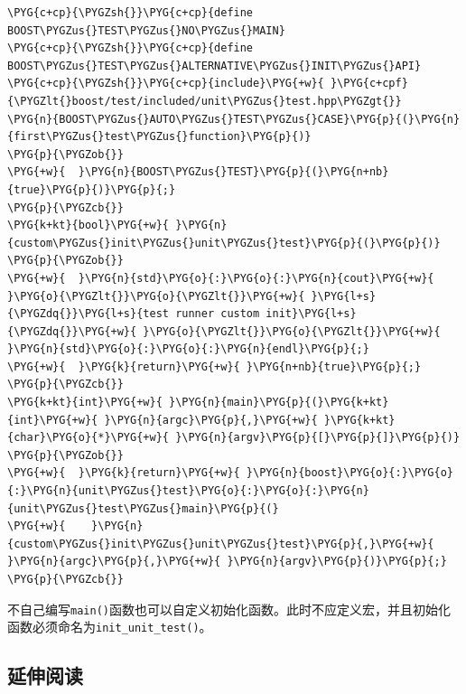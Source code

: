 \begin{codeblockbg}
\begin{Verbatim}[commandchars=\\\{\},breaklines=true,breakanywhere=true,fontsize=\codefont,xleftmargin=17bp]
\PYG{c+cp}{\PYGZsh{}}\PYG{c+cp}{define BOOST\PYGZus{}TEST\PYGZus{}NO\PYGZus{}MAIN}
\PYG{c+cp}{\PYGZsh{}}\PYG{c+cp}{define BOOST\PYGZus{}TEST\PYGZus{}ALTERNATIVE\PYGZus{}INIT\PYGZus{}API}
\PYG{c+cp}{\PYGZsh{}}\PYG{c+cp}{include}\PYG{+w}{ }\PYG{c+cpf}{\PYGZlt{}boost/test/included/unit\PYGZus{}test.hpp\PYGZgt{}}
\PYG{n}{BOOST\PYGZus{}AUTO\PYGZus{}TEST\PYGZus{}CASE}\PYG{p}{(}\PYG{n}{first\PYGZus{}test\PYGZus{}function}\PYG{p}{)}
\PYG{p}{\PYGZob{}}
\PYG{+w}{  }\PYG{n}{BOOST\PYGZus{}TEST}\PYG{p}{(}\PYG{n+nb}{true}\PYG{p}{)}\PYG{p}{;}
\PYG{p}{\PYGZcb{}}
\PYG{k+kt}{bool}\PYG{+w}{ }\PYG{n}{custom\PYGZus{}init\PYGZus{}unit\PYGZus{}test}\PYG{p}{(}\PYG{p}{)}
\PYG{p}{\PYGZob{}}
\PYG{+w}{  }\PYG{n}{std}\PYG{o}{:}\PYG{o}{:}\PYG{n}{cout}\PYG{+w}{ }\PYG{o}{\PYGZlt{}}\PYG{o}{\PYGZlt{}}\PYG{+w}{ }\PYG{l+s}{\PYGZdq{}}\PYG{l+s}{test runner custom init}\PYG{l+s}{\PYGZdq{}}\PYG{+w}{ }\PYG{o}{\PYGZlt{}}\PYG{o}{\PYGZlt{}}\PYG{+w}{ }\PYG{n}{std}\PYG{o}{:}\PYG{o}{:}\PYG{n}{endl}\PYG{p}{;}
\PYG{+w}{  }\PYG{k}{return}\PYG{+w}{ }\PYG{n+nb}{true}\PYG{p}{;}
\PYG{p}{\PYGZcb{}}
\PYG{k+kt}{int}\PYG{+w}{ }\PYG{n}{main}\PYG{p}{(}\PYG{k+kt}{int}\PYG{+w}{ }\PYG{n}{argc}\PYG{p}{,}\PYG{+w}{ }\PYG{k+kt}{char}\PYG{o}{*}\PYG{+w}{ }\PYG{n}{argv}\PYG{p}{[}\PYG{p}{]}\PYG{p}{)}
\PYG{p}{\PYGZob{}}
\PYG{+w}{  }\PYG{k}{return}\PYG{+w}{ }\PYG{n}{boost}\PYG{o}{:}\PYG{o}{:}\PYG{n}{unit\PYGZus{}test}\PYG{o}{:}\PYG{o}{:}\PYG{n}{unit\PYGZus{}test\PYGZus{}main}\PYG{p}{(}
\PYG{+w}{    }\PYG{n}{custom\PYGZus{}init\PYGZus{}unit\PYGZus{}test}\PYG{p}{,}\PYG{+w}{ }\PYG{n}{argc}\PYG{p}{,}\PYG{+w}{ }\PYG{n}{argv}\PYG{p}{)}\PYG{p}{;}
\PYG{p}{\PYGZcb{}}
\end{Verbatim}
\end{codeblockbg}



\begin{myNote}[tip]
不自己编写\texttt{main()}函数也可以自定义初始化函数。此时不应定义宏，并且初始化函数必须命名为\texttt{init\_\allowbreak{}unit\_\allowbreak{}test()}。
\end{myNote}



\subsection{延伸阅读}


